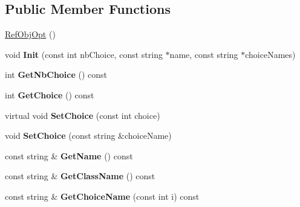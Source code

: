 \subsection*{Public Member Functions}
\begin{DoxyCompactItemize}
\item 
\mbox{\hyperlink{class_obj_cryst_1_1_ref_obj_opt_ad4fd60241264e22179c9ab33fc58867f}{Ref\+Obj\+Opt}} ()
\item 
\mbox{\label{class_obj_cryst_1_1_ref_obj_opt_acb2124833f426224863027d1f3f0e9d6}} 
void {\bfseries Init} (const int nb\+Choice, const string $\ast$name, const string $\ast$choice\+Names)
\item 
\mbox{\label{class_obj_cryst_1_1_ref_obj_opt_a682168d813d16167b59a8888ecaedff0}} 
int {\bfseries Get\+Nb\+Choice} () const
\item 
\mbox{\label{class_obj_cryst_1_1_ref_obj_opt_a023fe7017577d7b5c8b44123869186f5}} 
int {\bfseries Get\+Choice} () const
\item 
\mbox{\label{class_obj_cryst_1_1_ref_obj_opt_a831bcd1e381e542ebee2500dfcf2965c}} 
virtual void {\bfseries Set\+Choice} (const int choice)
\item 
\mbox{\label{class_obj_cryst_1_1_ref_obj_opt_a9a92c1a5543e46119687462a1b7e706e}} 
void {\bfseries Set\+Choice} (const string \&choice\+Name)
\item 
\mbox{\label{class_obj_cryst_1_1_ref_obj_opt_afa327e06a03e62b5643f3759b306c30a}} 
const string \& {\bfseries Get\+Name} () const
\item 
\mbox{\label{class_obj_cryst_1_1_ref_obj_opt_a0a9b58743511169ce9705244302e21d0}} 
const string \& {\bfseries Get\+Class\+Name} () const
\item 
\mbox{\label{class_obj_cryst_1_1_ref_obj_opt_ad6c7b293ae14231a1f7fea4c22132534}} 
const string \& {\bfseries Get\+Choice\+Name} (const int i) const
\item 
\mbox{\label{class_obj_cryst_1_1_ref_obj_opt_a0f9cb7883e94e457bd91ed40425c9289}} 

\end{DoxyCompactItemize}
